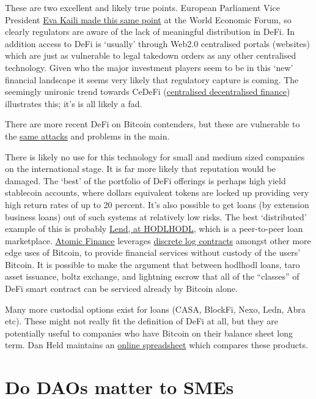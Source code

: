 These are two excellent and likely true points. European Parliament Vice President \href{https://cointelegraph.com/news/wef-2022-most-defi-protocols-aren-t-really-decentralized-says-european-parliament-vp?}{Eva Kaili made this same point} at the World Economic Forum, so clearly regulators are aware of the lack of meaningful distribution in DeFi. In addition access to DeFi is `usually' through Web2.0 centralised portals (websites) which are just as vulnerable to legal takedown orders as any other centralised technology. Given who the major investment players seem to be in this `new' financial landscape it seems very likely that regulatory capture is coming. The seemingly unironic trend towards CeDeFi (\href{https://www.nasdaq.com/articles/cedefi-what-it-is-and-why-it-matters}{centralised decentralised finance}) illustrates this; it's is all likely a fad.\par
There are more recent DeFi on Bitcoin contenders, but these are vulnerable to the \href{https://bisq.community/t/trading-halted-until-v1-3-0-hotfix/9208}{same attacks} and problems in the main. \par 
There is likely no use for this technology for small and medium sized companies on the international stage. It is far more likely that reputation would be damaged. The `best' of the portfolio of DeFi offerings is perhaps high yield stablecoin accounts, where dollars equivalent tokens are locked up providing very high return rates of up to 20 percent. It's also possible to get loans (by extension business loans) out of such systems at relatively low risks. The best `distributed' example of this is probably \href{https://lend.hodlhodl.com/}{Lend, at HODLHODL}, which is a peer-to-peer loan marketplace. \href{https://atomic.finance/blog/a-laypersons-guide-to-discreet-log-contracts-atomic-yield-series-part-3/}{Atomic Finance} leverages \href{https://adiabat.github.io/dlc.pdf}{discrete log contracts} amongst other more edge uses of Bitcoin, to provide financial services without custody of the users' Bitcoin. It is possible to make the argument that between hodlhodl loans, taro asset issuance, boltz exchange, and lightning escrow that all of the ``classes'' of DeFi smart contract can be serviced already by Bitcoin alone.\par
Many more custodial options exist for loans (CASA, BlockFi, Nexo, Ledn, Abra etc). These might not really fit the definition of DeFi at all, but they are potentially useful to companies who have Bitcoin on their balance sheet long term. Dan Held maintains an \href{https://docs.google.com/spreadsheets/d/1ZoapTCl76wahFMeNISSx9UdC3QBx-zC_jY4Le1H5Sdg/htmlview#}{online spreadsheet} which compares these products.\par
\section{Do DAOs matter to SMEs}
